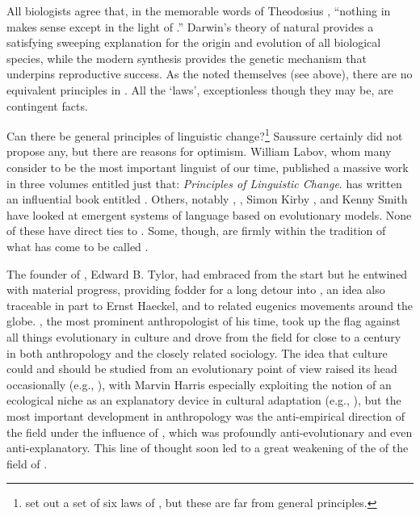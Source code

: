 \documentclass[output=paper,
modfonts
]{LSP/langsci}
\begin{document}
All biologists agree that, in the memorable words of Theodosius \citet{dobzhansky2013}, ``nothing in  makes sense except in the light of .''  Darwin's theory of natural  provides a satisfying sweeping explanation for the origin and evolution of all biological species, while the modern synthesis provides the genetic mechanism that underpins reproductive success. As the  noted themselves (see above), there are no equivalent principles in .  All the ‘laws', exceptionless though they may be, are contingent facts.

Can there be general principles of linguistic change?\footnote{\citet{Kurylowicz1935} set out a set of six laws of , but these are far from general principles.} Saussure certainly did not propose any, but there are reasons for optimism.  William Labov, whom many consider to be the most important linguist of our time, published a massive work in three volumes \citep{Labov1994,Labov2001,Labov2010} entitled just that: \textit{Principles of Linguistic Change}. \citet{blevins2004} has written an influential book entitled . Others, notably \citet{deboer2001}, \citet{galantucci2005}, Simon Kirby \citep{verhoefetal2014}, and Kenny Smith \citep{kirbyetal2015} have looked at emergent systems of language based on evolutionary models. None of these have direct ties to . Some, though, are firmly within the tradition of what has come to be called .

The founder of , Edward B. Tylor, had embraced  from the start \citep{Tylor1871} but he entwined  with material progress, providing fodder for a long detour into , an idea also traceable in part to Ernst Haeckel, and to related eugenics movements around the globe. , the most prominent anthropologist of his time, took up the flag against all things evolutionary in culture \citep{boas1928} and drove  from the field for close to a century in both anthropology and the closely related sociology. The idea that culture could and should be studied from an evolutionary point of view raised its head occasionally (e.g., \citealt{Sahlins1960}), with Marvin Harris especially exploiting the notion of an ecological niche as an explanatory device in cultural adaptation (e.g., \citealt{Harris1979}), but the most important development in anthropology was the anti-empirical direction of the field under the influence of \citet{Geertz1973}, which was profoundly anti-evolutionary and even anti-explanatory. This line of thought soon led to a great weakening of the  of the field of .
\end{document}
